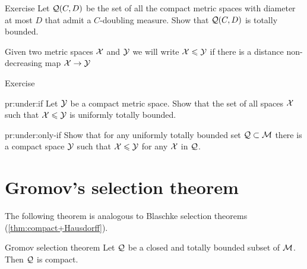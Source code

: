 \begin{thm}{Exercise}\label{pr:doubling}
Let $\mathcal{Q}(C,D)$ be the set of all the compact metric spaces with diameter at most $D$ that admit a $C$-doubling measure.
Show that $\mathcal{Q}(C,D)$ is totally bounded.
\end{thm}

Given two metric spaces $\mathcal{X}$ and $\mathcal{Y}$ we will write $\mathcal{X}\leqslant\mathcal{Y}$ if there is a distance non-decreasing map $\mathcal{X}\to\mathcal{Y}$

\begin{thm}{Exercise}\label{pr:under}

\begin{subthm}{pr:under:if}
Let $\mathcal{Y}$ be a compact metric space.
Show that the set of all spaces $\mathcal{X}$ such that $\mathcal{X}\leqslant\mathcal{Y}$
is uniformly totally bounded.
\end{subthm}

\begin{subthm}{pr:under:only-if}
Show that for any uniformly totally bounded set $\mathcal{Q}\subset\mathcal{M}$ there is a compact space $\mathcal{Y}$
such that $\mathcal{X}\leqslant\mathcal{Y}$ for any $\mathcal{X}$ in $\mathcal{Q}$.
\end{subthm}

\end{thm}

\section{Gromov's selection theorem}

The following theorem is analogous to Blaschke selection theorems (\ref{thm:compact+Hausdorff}).

\begin{thm}{Gromov selection theorem}\label{thm:gromov-compactness}%
Let $\mathcal{Q}$ be a closed and totally bounded subset of $\mathcal{M}$.
Then $\mathcal{Q}$ is compact.
\end{thm}


